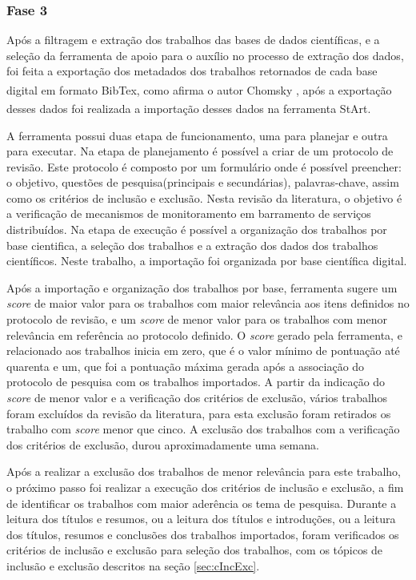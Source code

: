 \subsubsection{Fase 3} Após a filtragem e extração dos trabalhos das bases de dados científicas, e a seleção da ferramenta de apoio para o auxílio no processo de extração dos dados, foi feita a exportação dos metadados dos trabalhos retornados de cada base digital em formato BibTex\textsuperscript{\textregistered}, como afirma o autor Chomsky \cite{chomsky1969linguistica}, após a exportação desses dados foi realizada a importação desses dados na ferramenta \acrshort{StArt}\textsuperscript{\textregistered}. 

A ferramenta possui duas etapa de funcionamento, uma para planejar e outra para executar. Na etapa de planejamento é possível a criar de um protocolo de revisão. Este protocolo é composto por um formulário onde é possível preencher: o objetivo, questões de pesquisa(principais e secundárias), palavras-chave, assim como os critérios de inclusão e exclusão. Nesta revisão da literatura, o objetivo é a verificação de mecanismos de monitoramento em barramento de serviços distribuídos. Na etapa de execução é possível a organização dos trabalhos por base cientifica, a seleção dos trabalhos e a extração dos dados dos trabalhos científicos. Neste trabalho, a importação foi organizada por base científica digital. 

Após a importação e organização dos trabalhos por base, ferramenta sugere um \textit{score} de maior valor para os trabalhos com maior relevância aos itens definidos no protocolo de revisão, e um \textit{score} de menor valor para os trabalhos com menor relevância em referência ao protocolo definido. O \textit{score} gerado pela ferramenta, e relacionado aos trabalhos inicia em zero, que é o valor mínimo de pontuação até quarenta e um, que foi a pontuação máxima gerada após a associação do protocolo de pesquisa com os trabalhos importados. A partir da indicação do \textit{score} de menor valor e a verificação dos critérios de exclusão, vários trabalhos foram excluídos da revisão da literatura, para esta exclusão foram retirados os trabalho com \textit{score} menor que cinco. A exclusão dos trabalhos com a verificação dos critérios de exclusão, durou aproximadamente uma semana. 

Após a realizar a exclusão dos trabalhos de menor relevância para este trabalho, o próximo passo foi realizar a execução dos critérios de inclusão e exclusão, a fim de identificar os trabalhos com maior aderência os tema de pesquisa. Durante a leitura dos títulos e resumos, ou a leitura dos títulos e introduções, ou a leitura dos títulos, resumos e conclusões dos trabalhos importados, foram verificados os critérios de inclusão e exclusão para seleção dos trabalhos, com os tópicos de inclusão e exclusão descritos na seção \ref{sec:cIncExc}. 

